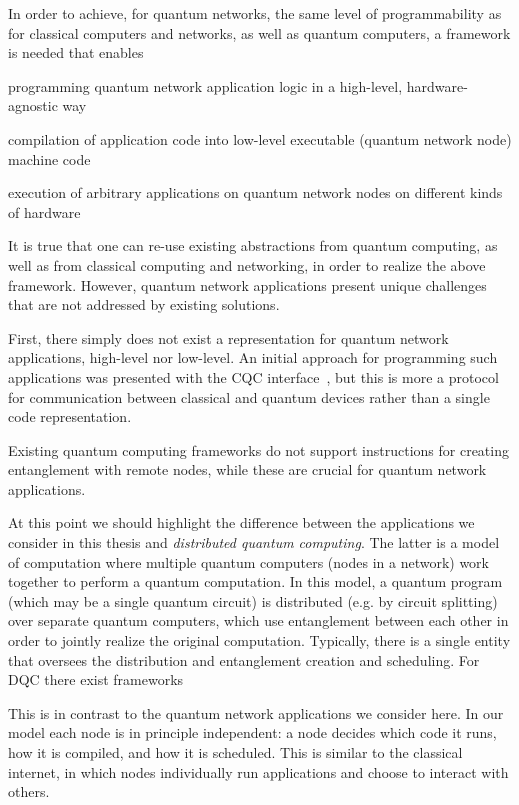 In order to achieve, for quantum networks, the same level of programmability as for classical computers and networks, as well as quantum computers, a framework is needed that enables
\begin{inlinelist}
\item programming quantum network application logic in a high-level, hardware-agnostic way
\item compilation of application code into low-level executable (quantum network node) machine code
\item execution of arbitrary applications on quantum network nodes on different kinds of hardware
\end{inlinelist}

It is true that one can re-use existing abstractions from quantum computing, as well as from classical computing and networking, in order to realize the above framework.
However, quantum network applications present unique challenges that are not addressed by existing solutions.

First, there simply does not exist a representation for quantum network applications, high-level nor low-level.
An initial approach for programming such applications was presented with the CQC interface~\cite{dahlberg2018simulaqron}, but this is more a protocol for communication between classical and quantum devices rather than a single code representation.

Existing quantum computing frameworks do not support instructions for creating entanglement with remote nodes, while these are crucial for quantum network applications.

At this point we should highlight the difference between the applications we consider in this thesis and \emph{distributed quantum computing}.
The latter is a model of computation where multiple quantum computers (nodes in a network) work together to perform a quantum computation.
In this model, a quantum program (which may be a single quantum circuit) is distributed (e.g. by circuit splitting) over separate quantum computers, which use entanglement between each other in order to jointly realize the original computation.
Typically, there is a single entity that oversees the distribution and entanglement creation and scheduling.
For DQC there exist frameworks 

This is in contrast to the quantum network applications we consider here.
In our model each node is in principle independent: a node decides which code it runs, how it is compiled, and how it is scheduled.
This is similar to the classical internet, in which nodes individually run applications and choose to interact with others.

